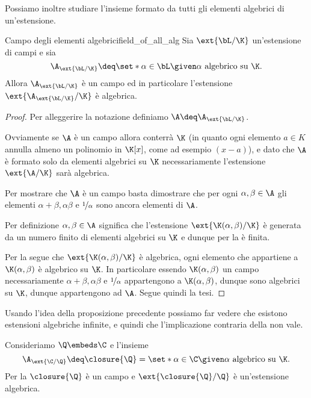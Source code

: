 Possiamo inoltre studiare l'insieme formato da tutti gli elementi algebrici di un'estensione.

\begin{proposition}
    {Campo degli elementi algebrici}{field_of_all_alg}
    Sia $\ext{\bL / \K}$ un'estensione di campi e sia \begin{equation}
        \A_{\ext{\bL / \K}} \deq \set*{\alpha \in \bL \given \alpha \text{ algebrico su } \K}.
    \end{equation} Allora $\A_{\ext{\bL / \K}}$ è un campo ed in particolare l'estensione $\ext{\A_{\ext{\bL / \K}} / \K}$ è algebrica. 
\end{proposition}
\begin{proof} 
    Per alleggerire la notazione definiamo $\A \deq \A_{\ext{\bL / \K}}$. 

    Ovviamente se $\A$ è un campo allora conterrà $\K$ (in quanto ogni elemento $a \in K$ annulla almeno un polinomio in $\K[x]$, come ad esempio $(x-a)$), e dato che $\A$ è formato solo da elementi algebrici su $\K$ necessariamente l'estensione $\ext{\A / \K}$ sarà algebrica.
    
    Per mostrare che $\A$ è un campo basta dimostrare che per ogni $\alpha, \beta \in \A$ gli elementi $\alpha + \beta, \alpha\beta$ e $\nicefrac1{\alpha}$ sono ancora elementi di $\A$.
    
    Per definizione $\alpha, \beta \in \A$ significa che l'estensione $\ext{\K(\alpha, \beta) / \K}$ è generata da un numero finito di elementi algebrici su $\K$ e dunque per la  è finita. 
    
    Per la  segue che $\ext{\K(\alpha, \beta) / \K}$ è algebrica, ogni elemento che appartiene a $\K(\alpha, \beta)$ è algebrico su $\K$. In particolare essendo $\K(\alpha, \beta)$ un campo necessariamente $\alpha + \beta, \alpha\beta$ e $\nicefrac1{\alpha}$ appartengono a $\K(\alpha, \beta)$, dunque sono algebrici su $\K$, dunque appartengono ad $\A$. Segue quindi la tesi. 
\end{proof}

Usando l'idea della proposizione precedente possiamo far vedere che esistono estensioni algebriche infinite, e quindi che l'implicazione contraria della  non vale.

Consideriamo $\Q \embeds \C$ e l'insieme \[
    \A_{\ext{\C / \Q}} 
    \deq \closure{\Q}
    = \set*{\alpha \in \C \given \alpha \text{ algebrico su } \K}.
\] Per la  $\closure{\Q}$ è un campo e $\ext{\closure{\Q} / \Q}$ è un'estensione algebrica.

